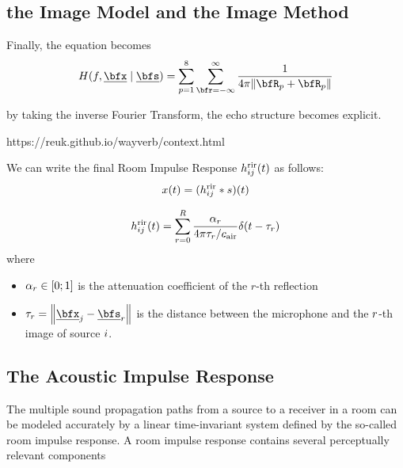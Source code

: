 \subsection{the Image Model and the Image Method}
Finally, the equation becomes
\begin{equation}
    \label{eq:acoustics:ims:frourier}
    H(f, \positionMicrophone \mid \positionSource) =
        \sum_{p=1}^{8}
            \sum_{\pos=-\infty}^{\infty}
                \frac{1}{4 \pi \norm{\coordinatePermutation_p +  \coordinatePermutation_p}}
\end{equation}

by taking the inverse Fourier Transform, the echo structure becomes explicit.

https://reuk.github.io/wayverb/context.html

We can write the final Room Impulse Response $h^{\text{rir}}_{ij}(t)$ as follows:
\begin{equation}
    x(t) = (h^{\text{rir}}_{ij} \ast s)(t)
\end{equation}

\begin{equation}
    \rir_{ij}(t) = \sum_{r=0}^{R} \frac{\alpha_r}{4 \pi \tau_r / \cair} \delta \kparen{t - \tau_r}
\end{equation}
where
\begin{itemize}
    \item $\alpha_r \in \kintervcc{0}{1}$ is the attenuation coefficient of the $r$-th reflection
    \item $\tau_r = \norm{\positionMicrophone_\idxMic - \positionSource_\idxEch}$ is the distance between the microphone and the $r$-th image of source $i$.
\end{itemize}

\subsection{The Acoustic Impulse Response}
The multiple sound propagation paths from a source to a receiver in a room can be
modeled accurately by a linear time-invariant system defined by the so-called room impulse response.
A room impulse response contains several perceptually relevant components


